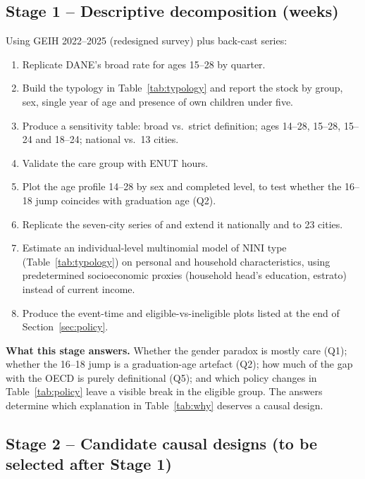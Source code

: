 \documentclass[11pt]{article}
\begin{document}
\subsection{Stage 1 -- Descriptive decomposition (weeks)}

Using GEIH 2022--2025 (redesigned survey) plus back-cast series:
\begin{enumerate}
\item Replicate DANE's broad rate for ages 15--28 by quarter.
\item Build the typology in Table~\ref{tab:typology} and report the stock by group, sex, single year of age and presence of own children under five.
\item Produce a sensitivity table: broad vs.\ strict definition; ages 14--28, 15--28, 15--24 and 18--24; national vs.\ 13 cities.
\item Validate the care group with ENUT hours.
\item Plot the age profile 14--28 by sex and completed level, to test whether the 16--18 jump coincides with graduation age (Q2).
\item Replicate the seven-city series of \citet{lasso2026} and extend it nationally and to 23 cities.
\item Estimate an individual-level multinomial model of NINI type (Table~\ref{tab:typology}) on personal and household characteristics, using predetermined socioeconomic proxies (household head's education, estrato) instead of current income.
\item Produce the event-time and eligible-vs-ineligible plots listed at the end of Section~\ref{sec:policy}.
\end{enumerate}

\noindent\textbf{What this stage answers.} Whether the gender paradox is mostly care (Q1); whether the 16--18 jump is a graduation-age artefact (Q2); how much of the gap with the OECD is purely definitional (Q5); and which policy changes in Table~\ref{tab:policy} leave a visible break in the eligible group. The answers determine which explanation in Table~\ref{tab:why} deserves a causal design.

\subsection{Stage 2 -- Candidate causal designs (to be selected after Stage 1)}
\end{document}
